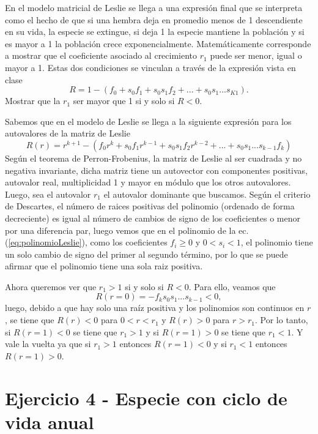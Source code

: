 \documentclass[letterpaper,12pt]{article}
\theoremstyle{plain}
\begin{document}
En el modelo matricial de Leslie se llega a una expresión final que se interpreta como el hecho de que si una hembra deja en promedio menos de 1 descendiente en su vida, la especie se extingue, si deja 1 la especie mantiene la población y si es mayor a 1 la población crece exponencialmente. Matemáticamente corresponde a mostrar que el coeficiente asociado al crecimiento $r_1$ puede ser menor, igual o mayor a 1. Estas dos condiciones se vinculan a través de la expresión vista en clase 
$$ R = 1 - (f_0 + s_0f_1 + s_0s_1f_2 + ... + s_0s_1 ... s_{K1}). $$
Mostrar que la $r_1$ ser mayor que 1 si y solo si $R < 0$.


Sabemos que en el modelo de Leslie se llega a la siguiente expresión para los autovalores de la matriz de Leslie 
\begin{equation}
    R(r) = r^{k+1} - (f_0r^{k} + s_0f_1r^{k-1} + s_0s_1f_2r^{k-2} + ... + s_0s_1 ... s_{k-1}f_{k})
    \label{eq:polinomioLeslie}
\end{equation}
Según el teorema de Perron-Frobenius, la matriz de Leslie al ser cuadrada y no negativa invariante, dicha matriz tiene un autovector con componentes positivas, autovalor real, multiplicidad 1 y mayor en módulo que los otros autovalores. Luego, sea el autovalor $r_1$ el autovalor dominante que buscamos. 
Según el criterio de Descartes, el número de raices positivas del polinomio (ordenado de forma decreciente) es igual al número de cambios de signo de los coeficientes o menor por una diferencia par, luego vemos que en el polinomio de la ec. (\ref*{eq:polinomioLeslie}), como los coeficientes $f_i\geq0$ y $0<s_i<1$, el polinomio tiene un solo cambio de signo del primer al segundo término, por lo que se puede afirmar que el polinomio tiene una sola raiz positiva.

Ahora queremos ver que $r_1>1$ si y solo si $R<0$. Para ello, veamos que 
\begin{equation}
    R(r=0) = - f_k s_0 s_1... s_{k-1} < 0,
\end{equation}
luego, debido a que hay solo una raíz positiva y los polinomios son continuos en $r$, se tiene que $R(r)<0$ para $0<r<r_1$ y $R(r)>0$ para $r>r_1$. Por lo tanto, si $R(r=1)<0$ se tiene que $r_1>1$ y si $R(r=1)>0$ se tiene que $r_1<1$. Y vale la vuelta ya que si $r_1>1$ entonces $R(r=1)<0$ y si $r_1<1$ entonces $R(r=1)>0$.

\section{Ejercicio 4 - Especie con ciclo de vida anual}
\end{document}

